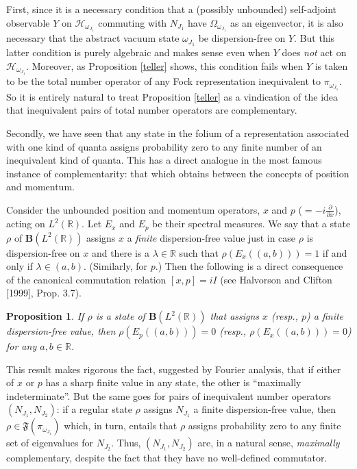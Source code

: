\documentclass[12pt]{article}
\newtheorem{prop}{Proposition}
\theoremstyle{remark}
\theoremstyle{definition}
\newcommand{\hil}[1]{\mathcal{#1}}
\begin{document}
First, since it is a necessary condition that a (possibly unbounded)
self-adjoint observable $Y$ on $\hil{H}_{\omega_{J_{1}}}$ commuting
with $N_{J_{1}}$ have $\Omega_{\omega_{J_{1}}}$ as an eigenvector, it
is also necessary that the abstract vacuum state $\omega_{J_{1}}$ be
dispersion-free on $Y$.  But this latter condition is purely algebraic
and makes sense even when $Y$ does \emph{not} act on
$\hil{H}_{\omega_{J_{1}}}$.  Moreover, as Proposition \ref{teller}
shows, this condition fails when $Y$ is taken to be the total number
operator of any Fock representation inequivalent to
$\pi_{\omega_{J_{1}}}$.  So it is entirely natural to treat
Proposition \ref{teller} as a vindication of the idea that
inequivalent pairs of total number operators are complementary.

Secondly, we have seen that any state in the folium of a representation 
associated with one kind of quanta 
assigns probability zero to any finite number of an inequivalent kind 
of quanta. This has a direct 
analogue in the most famous instance of complementarity: that which 
obtains between the concepts of position and momentum.  

Consider the 
unbounded position and momentum operators, $x$ and $p$ 
($=-i\frac{\partial}{\partial 
x}$), acting on $L^{2}(\mathbb{R})$.  Let $E_{x}$ and $E_{p}$ be their 
spectral measures.  We say that a state $\rho$ of 
$\mathbf{B}(L^{2}(\mathbb{R}))$ assigns $x$ a \emph{finite} 
dispersion-free value just in case $\rho$ is dispersion-free on $x$ and 
there is a $\lambda\in \mathbb{R}$ such that $\rho(E_{x}((a,b)))=1$ if and 
only if $\lambda\in (a,b)$.  (Similarly, for $p$.)   Then the following 
is a direct 
consequence of the canonical commutation relation 
$[x,p]=iI$ (see Halvorson and Clifton [1999], Prop. 3.7).
\begin{prop}  \label{us} If $\rho$ is a state of 
$\mathbf{B}(L^{2}(\mathbb{R}))$ that assigns $x$ (resp., $p$) a finite 
dispersion-free value, then $\rho(E_{p}((a,b)))=0$ (resp., 
$\rho(E_{x}((a,b)))=0$) for any $a,b\in\mathbb{R}$.  
\end{prop}
\noindent This result makes rigorous the fact, 
suggested by Fourier analysis, that if either of $x$ or $p$ has a 
sharp finite value in any state, the other is ``maximally indeterminate''. 
But the same goes for pairs of inequivalent number operators 
$(N_{J_{1}},N_{J_{2}})$: if a regular state $\rho$ assigns $N_{J_{1}}$ a 
finite dispersion-free value, then 
$\rho\in\mathfrak{F}(\pi_{\omega_{J_{1}}})$ which, in turn, entails 
that $\rho$ assigns probability zero to any finite set of eigenvalues 
for $N_{J_{2}}$.  Thus, $(N_{J_{1}},N_{J_{2}})$ 
are, in a natural sense, \emph{maximally} complementary, despite the fact 
that they have no well-defined commutator.
\end{document}
